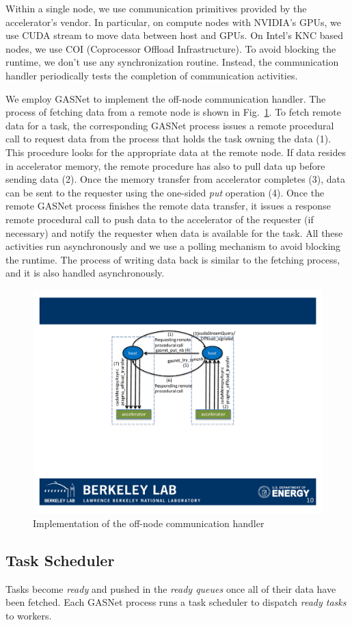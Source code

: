 Within a single node, we use communication primitives provided by the accelerator's vendor.
In particular, on compute nodes with NVIDIA's GPUs, we use CUDA stream to move data between host and GPUs.
On Intel's KNC based nodes, we use COI (Coprocessor Offload Infrastructure).
To avoid blocking the runtime, we don't use any synchronization routine.
Instead, the communication handler periodically tests the completion of communication activities.

We employ GASNet to implement the off-node communication handler.
The process of fetching data from a remote node is shown in Fig.~\ref{fig:offnode}.
To fetch remote data for a task, the corresponding GASNet process issues a remote procedural call to request data from the process that holds the task owning the data (1).
This procedure looks for the appropriate data at the remote node.
If data resides in accelerator memory, the remote procedure has also to pull data up before sending data (2).
Once the memory transfer from accelerator completes (3), data can be sent to the requester using the one-sided {\em put} operation (4).
Once the remote GASNet process finishes the remote data transfer, it issues a response remote procedural call to push data to the accelerator of the requester (if necessary) and notify the requester when data is available for the task.
All these activities run asynchronously and we use a polling mechanism to avoid blocking the runtime.
The process of writing data back is similar to the fetching process, and it is also handled asynchronously.


\begin{figure}[htb]
\centering
\includegraphics[width=.49\textwidth]{figures/handler.pdf}
\caption{Implementation of the off-node communication handler}
\label{fig:offnode}
\end{figure}

\subsection{Task Scheduler}
Tasks become {\em ready} and pushed in the {\em ready queues} once all of their data have been fetched.
Each GASNet process runs a task scheduler to dispatch {\em ready tasks} to workers. 

